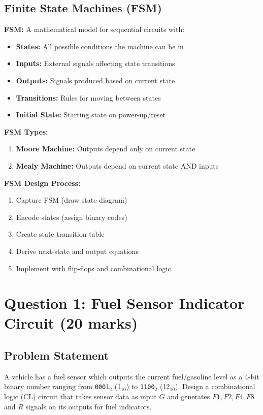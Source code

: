 \documentclass[12pt,a4paper]{article}
\newcommand{\bitvec}[1]{\texttt{#1}}
\begin{document}
\subsection{Finite State Machines (FSM)}

\textbf{FSM:} A mathematical model for sequential circuits with:
\begin{itemize}
  \item \textbf{States:} All possible conditions the machine can be in
  \item \textbf{Inputs:} External signals affecting state transitions
  \item \textbf{Outputs:} Signals produced based on current state
  \item \textbf{Transitions:} Rules for moving between states
  \item \textbf{Initial State:} Starting state on power-up/reset
\end{itemize}

\textbf{FSM Types:}
\begin{enumerate}
  \item \textbf{Moore Machine:} Outputs depend only on current state
  \item \textbf{Mealy Machine:} Outputs depend on current state AND inputs
\end{enumerate}

\textbf{FSM Design Process:}
\begin{enumerate}
  \item Capture FSM (draw state diagram)
  \item Encode states (assign binary codes)
  \item Create state transition table
  \item Derive next-state and output equations
  \item Implement with flip-flops and combinational logic
\end{enumerate}

\newpage
\section{Question 1: Fuel Sensor Indicator Circuit (20 marks)}

\subsection{Problem Statement}

A vehicle has a fuel sensor which outputs the current fuel/gasoline level as a 4-bit binary number ranging from \bitvec{0001}$_2$ (1$_{10}$) to \bitvec{1100}$_2$ (12$_{10}$). Design a combinational logic (CL) circuit that takes sensor data as input $G$ and generates $F1, F2, F4, F8$ and $R$ signals on its outputs for fuel indicators.
\end{document}
